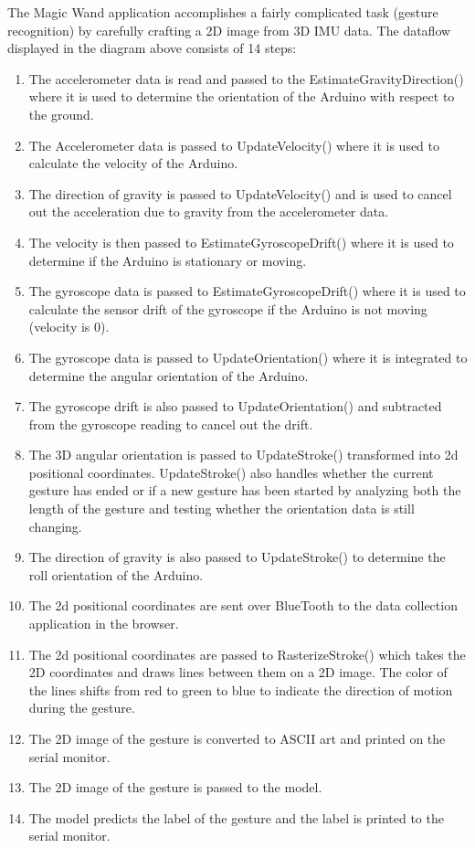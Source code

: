     The Magic Wand application accomplishes a fairly complicated task (gesture recognition) by carefully crafting a 2D image from 3D IMU data. The dataflow displayed in the diagram above consists of 14 steps:
    
  \begin{enumerate}
    \item The accelerometer data is read and passed to the EstimateGravityDirection() where it is used to determine the orientation of the Arduino with respect to the ground.
    \item The Accelerometer data is passed to UpdateVelocity() where it is used to calculate the velocity of the Arduino.
    \item The direction of gravity is passed to UpdateVelocity() and is used to cancel out the acceleration due to gravity from the accelerometer data.
    \item The velocity is then passed to EstimateGyroscopeDrift() where it is used to determine if the Arduino is stationary or moving.
    \item The gyroscope data is passed to EstimateGyroscopeDrift() where it is used to calculate the sensor drift of the gyroscope if the Arduino is not moving (velocity is 0).
    \item The gyroscope data is passed to UpdateOrientation() where it is integrated to determine the angular orientation of the Arduino.
    \item The gyroscope drift is also passed to UpdateOrientation() and subtracted from the gyroscope reading to cancel out the drift.
    \item The 3D angular orientation is passed to UpdateStroke() transformed into 2d positional coordinates. UpdateStroke() also handles whether the current gesture has ended or if a new gesture has been started by analyzing both the length of the gesture and testing whether the orientation data is still changing.
    \item The direction of gravity is also passed to UpdateStroke() to determine the roll orientation of the Arduino.
    \item The 2d positional coordinates are sent over BlueTooth to the data collection application in the browser.
    \item The 2d positional coordinates are passed to RasterizeStroke() which takes the 2D coordinates and draws lines between them on a 2D image. The color of the lines shifts from red to green to blue to indicate the direction of motion during the gesture.
    \item The 2D image of the gesture is converted to ASCII art and printed on the serial monitor.
    \item The 2D image of the gesture is passed to the model.
    \item The model predicts the label of the gesture and the label is printed to the serial monitor.
  \end{enumerate}

